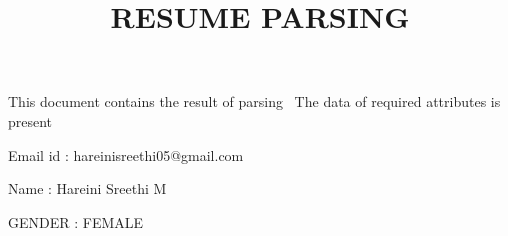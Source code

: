 This document contains the result of parsing
\ The data of required attributes is present
    \title { RESUME PARSING }
 



 Email id : { hareinisreethi05@gmail.com }

 Name : {Hareini Sreethi M}


 GENDER : { FEMALE }

